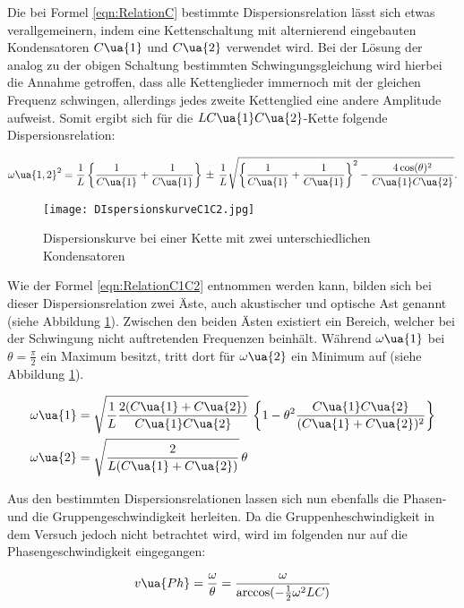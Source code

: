 Die bei Formel \eqref{eqn:RelationC} bestimmte Dispersionsrelation lässt
sich etwas verallgemeinern, indem eine Kettenschaltung  mit alternierend eingebauten
Kondensatoren $C\ua{1}$ und $C\ua{2}$ verwendet wird. Bei der Lösung der analog
zu der obigen Schaltung bestimmten Schwingungsgleichung wird hierbei die Annahme
getroffen, dass alle Kettenglieder immernoch mit der gleichen Frequenz schwingen,
allerdings jedes zweite Kettenglied eine andere Amplitude aufweist. Somit ergibt
sich für die $LC\ua{1}C\ua{2}$-Kette folgende Dispersionsrelation:

\begin{equation}
  \omega\ua{1,2}^2 = \frac{1}{L} \left\{ \frac{1}{C\ua{1}} + \frac{1}{C\ua{1}}
  \right\} \, \pm \, \frac{1}{L} \sqrt{ \left\{ \frac{1}{C\ua{1}} + \frac{1}{C\ua{1}}
  \right\}^2  - \frac{4\cos(\theta)^2}{C\ua{1}C\ua{2}}} .
  \label{eqn:RelationC1C2}
\end{equation}

\begin{figure}
  \texttt{[image: DIspersionskurveC1C2.jpg]}
  \caption{Dispersionskurve bei einer Kette mit zwei unterschiedlichen Kondensatoren}
  \label{fig:RelationC12}
\end{figure}

Wie der Formel \eqref{eqn:RelationC1C2} entnommen werden kann, bilden sich bei
dieser Dispersionsrelation zwei Äste, auch akustischer und optische Ast genannt
(siehe Abbildung \ref{fig:RelationC12}). Zwischen den beiden Ästen existiert ein Bereich, welcher
bei der Schwingung nicht auftretenden Frequenzen beinhält. Während $\omega\ua{1}$
bei $\theta = \frac{\pi}{2}$ ein Maximum besitzt, tritt dort für $\omega\ua{2}$
ein Minimum auf (siehe Abbildung \ref{fig:RelationC12}).


\begin{align}
  \omega\ua{1} &= \sqrt{ \frac{1}{L} \frac{2(C\ua{1} + C\ua{2})}{C\ua{1}C\ua{2}}} \,
  \left\{ 1 - \theta^2 \frac{C\ua{1}C\ua{2}}{(C\ua{1} + C\ua{2})^2} \right\} \\
  \omega\ua{2} &= \sqrt{ \frac{2}{L(C\ua{1} + C\ua{2})}} \, \theta
\end{align}

Aus den bestimmten Dispersionsrelationen lassen sich nun ebenfalls die Phasen- und
die Gruppengeschwindigkeit herleiten. Da die Gruppenheschwindigkeit in dem Versuch
jedoch nicht betrachtet wird, wird im folgenden nur auf die Phasengeschwindigkeit
eingegangen:

\begin{equation}
  v\ua{Ph} = \frac{\omega}{\theta} = \frac{\omega}{\arccos(-\frac{1}{2}\omega^2LC)}
\end{equation}


